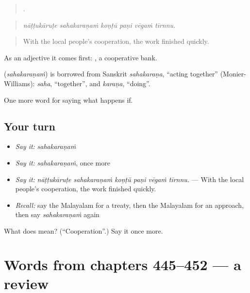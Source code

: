 \begin{quote}
     .
\end{quote}

\begin{quote}
\emph{nāṭṭukāruṭe sahakaraṇaṁ koṇṭŭ paṇi vēgaṁ tīrnnu.}
\end{quote}

\begin{quote}
With the local people's cooperation, the work finished quickly.
\end{quote}

As an adjective it comes first:  , a cooperative bank.

\begin{cousinweb}
\textbf{} (\emph{sahakaraṇaṁ}) is borrowed from Sanskrit \emph{sahakaraṇa}, \textquotedblleft{}acting together\textquotedblright{} (Monier-Williams): \emph{saha}, \textquotedblleft{}together\textquotedblright{}, and \emph{karaṇa}, \textquotedblleft{}doing\textquotedblright{}.
\end{cousinweb}

\begin{grammarlens}[title={What you've built}]
One more word for saying what happens if.
\end{grammarlens}

\subsection*{Your turn}
\begin{itemize}
\raggedright
  \item \emph{Say it:} \emph{sahakaraṇaṁ}
  \item \emph{Say it:} \emph{sahakaraṇaṁ}, once more
  \item \emph{Say it:} \emph{nāṭṭukāruṭe sahakaraṇaṁ koṇṭŭ paṇi vēgaṁ tīrnnu.} — With the local people's cooperation, the work finished quickly.
  \item \emph{Recall:} say the Malayalam for a treaty, then the Malayalam for an approach, then say \emph{sahakaraṇaṁ} again
\end{itemize}

\begin{tcolorbox}[breakable,colback=teal!4,colframe=teal!35!black,title={Before you move on}]
What does  mean? (\textquotedblleft{}Cooperation\textquotedblright{}.) Say it once more.
\end{tcolorbox}
\section[(dialogue)]{Words from chapters 445–452 — a review}

